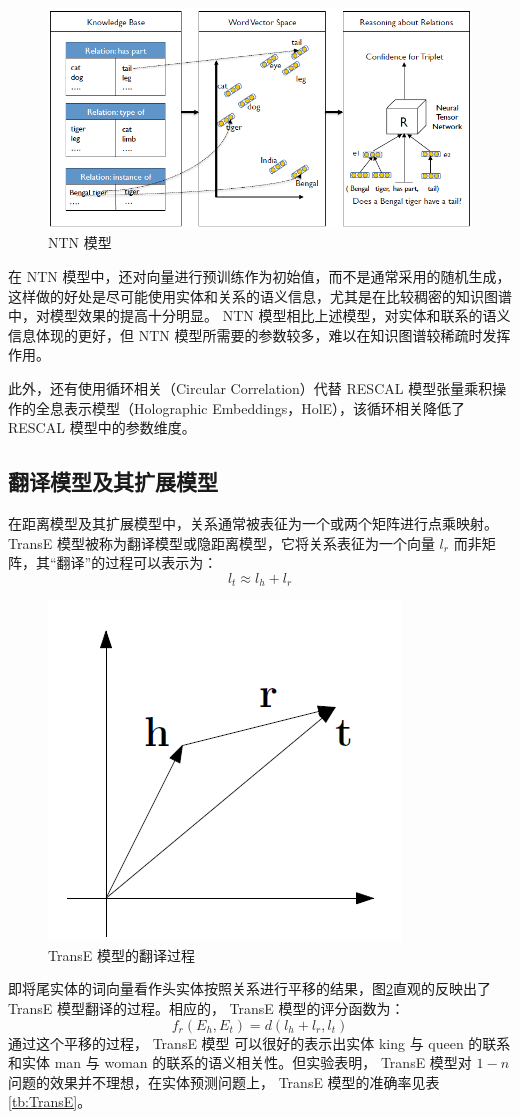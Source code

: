 \documentclass{llncs}
\begin{document}
\begin{figure}
	\centering
	\includegraphics[width=0.8\columnwidth]{figures/NTN.png}
	\caption{ NTN 模型}
	\label{fg:NTN}
\end{figure}
在 NTN 模型中，还对向量进行预训练作为初始值，而不是通常采用的随机生成，这样做的好处是尽可能使用实体和关系的语义信息，尤其是在比较稠密的知识图谱中，对模型效果的提高十分明显。 NTN 模型相比上述模型，对实体和联系的语义信息体现的更好，但 NTN 模型所需要的参数较多，难以在知识图谱较稀疏时发挥作用。

此外，还有使用循环相关（Circular Correlation）代替 RESCAL 模型张量乘积操作的全息表示模型（Holographic Embeddings，HolE）\cite{DBLP:conf/aaai/NickelRP16}，该循环相关降低了 RESCAL 模型中的参数维度。

\subsection{翻译模型及其扩展模型}

在距离模型及其扩展模型中，关系通常被表征为一个或两个矩阵进行点乘映射。 TransE 模型\cite{DBLP:conf/nips/BordesUGWY13}被称为翻译模型或隐距离模型，它将关系表征为一个向量 $l_r$ 而非矩阵，其“翻译”的过程可以表示为：
\begin{displaymath}
l_t\approx l_h+l_r
\end{displaymath}
\begin{figure}
	\centering
	\includegraphics[width=0.5\columnwidth]{figures/TransE.png}
	\caption{ TransE 模型的翻译过程}
	\label{fg:TransE}
\end{figure}
即将尾实体的词向量看作头实体按照关系进行平移的结果，图\ref{fg:TransE}直观的反映出了 TransE 模型翻译的过程。相应的， TransE 模型的评分函数为：
\begin{displaymath}
f_r(E_h,E_t)=d(l_h+l_r,l_t)
\end{displaymath}
通过这个平移的过程， TransE 模型 可以很好的表示出实体 king 与 queen 的联系和实体 man 与 woman 的联系的语义相关性。但实验\cite{DBLP:conf/nips/BordesUGWY13}表明， TransE 模型对 $1-n$ 问题的效果并不理想，在实体预测问题上， TransE 模型的准确率见表\ref{tb:TransE}。
\end{document}

